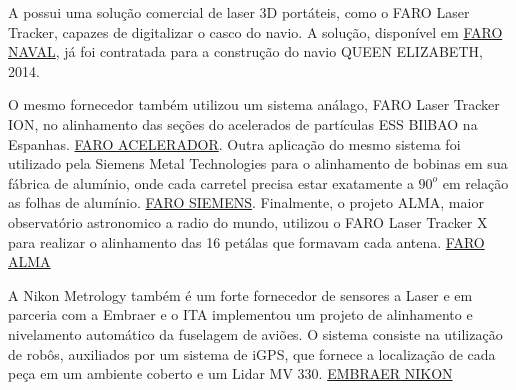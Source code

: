 

A  possui uma solução comercial de laser 3D portáteis,
como o FARO Laser Tracker, capazes de digitalizar o casco do navio. A solução,
disponível em
\href{http://www.faro.com/measurement-solutions/industries/shipbuilding/2015/02/18/scanning-at-depth-three-dimensional-measurement-of-an-ocean-giant}{FARO
NAVAL}, já foi contratada para a construção do navio QUEEN ELIZABETH, 2014.

O mesmo fornecedor também utilizou um sistema análago, FARO Laser
Tracker ION, no alinhamento das seções do acelerados de partículas ESS BIlBAO na
Espanhas.
\href{http://www.faro.com/measurement-solutions/applications/alignment/2013/02/15/faro-laser-tracker-integrated-into-the-ess-bilbao-particle-accelerator}{FARO
 ACELERADOR}. Outra aplicação do mesmo sistema foi utilizado pela Siemens Metal
 Technologies para o alinhamento de bobinas em sua fábrica de alumínio, onde
 cada carretel precisa estar exatamente a $90^o$ em relação as folhas de
 alumínio.
\href{http://www.faro.com/measurement-solutions/applications/alignment/2012/06/19/perfect-alignment-for-steel-and-aluminium-mills-at-siemens-with-faro-devices}{FARO
SIEMENS}. Finalmente, o projeto ALMA, maior observatório astronomico a radio do
mundo, utilizou o FARO Laser Tracker X para realizar o alinhamento das 16
petálas que formavam cada antena. 
\href{http://www.faro.com/measurement-solutions/applications/alignment/2012/03/02/world-s-largest-radio-astronomical-project-in-the-atacama-desert-in-chile}{FARO
ALMA}

A Nikon Metrology também é um forte fornecedor de sensores a Laser e em
parceria com a Embraer e o ITA implementou um projeto de alinhamento e
nivelamento automático da fuselagem de aviões. O sistema consiste na utilização
de robôs, auxiliados por um sistema de iGPS, que fornece a localização de cada
peça em um ambiente coberto e um Lidar MV 330.
\href{http://blog.nikonmetrology.com/blog/nikon-metrology-supplies-igps-and-laser-radar/}{EMBRAER
NIKON}

